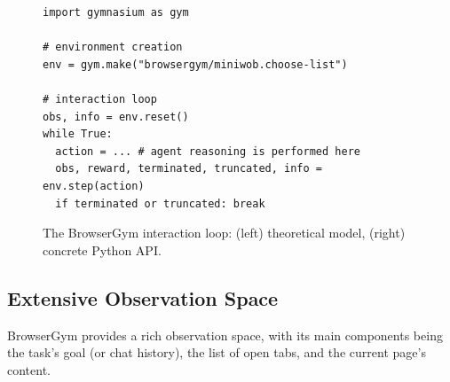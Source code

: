 \documentclass[10pt]{article} %
\begin{document}
\begin{figure}[ht]
    \centering%
\hspace*{\fill}%
\begin{minipage}{0.41\textwidth}
\end{minipage}%
\hspace*{\fill}%
\begin{minipage}{0.54\textwidth}
\begin{verbatim}
import gymnasium as gym

# environment creation
env = gym.make("browsergym/miniwob.choose-list")

# interaction loop
obs, info = env.reset()
while True:
  action = ... # agent reasoning is performed here
  obs, reward, terminated, truncated, info = env.step(action)
  if terminated or truncated: break
\end{verbatim}
\end{minipage}%
\hspace*{\fill}%
    \caption{The BrowserGym interaction loop: (left) theoretical model, (right) concrete Python API.}
    \label{fig:browser-loop}
\end{figure}

\subsection{Extensive Observation Space}

BrowserGym provides a rich observation space, with its main components being the task's goal (or chat history), the list of open tabs, and the current page's content.
\end{document}
